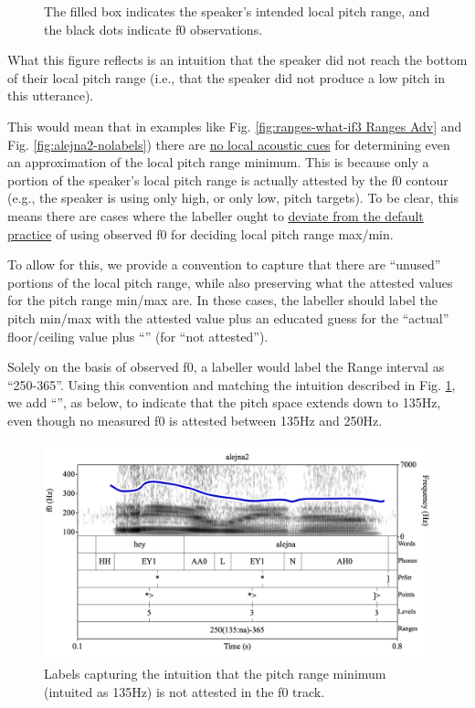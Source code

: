 \documentclass[11pt, twoside]{memoir}
\def\textlabel#1{{\relsize{-.5}\fontspec[Mapping=tex-text]{Roboto Mono}{#1}}}
\begin{document}
\begin{figure}[H]
\centering
%

%
\caption{The filled box indicates the speaker’s intended local pitch range, and the black dots indicate f0 observations.%
\label{fig:ranges intuition alejna2}%
}
\end{figure}

What this figure reflects is an intuition that the speaker did not reach the bottom of their local pitch range (i.e., that the speaker did not produce a low pitch in this utterance).

This would mean that in examples like Fig. \ref{fig:ranges-what-if3 Ranges Adv} and Fig. \ref{fig:alejna2-nolabels}) there are \uline{no local acoustic cues} for determining even an approximation of the local pitch range minimum. This is because only a portion of the speaker’s local pitch range is actually attested by the f0 contour (e.g., the speaker is using only high, or only low, pitch targets). To be clear, this means there are cases where the labeller ought to \uline{deviate from the default practice} of using observed f0 for deciding local pitch range max\slash min.

To allow for this, we provide a convention to capture that there are “unused” portions of the local pitch range, while also preserving what the attested values for the pitch range min\slash max are. In these cases, the labeller should label the pitch min\slash max with the attested value plus an educated guess for the “actual” floor\slash ceiling value plus “\textlabel{:na}” (for “not attested”).

Solely on the basis of observed f0, a labeller would label the Range interval as “250-365”. Using this convention and matching the intuition described in Fig. \ref{fig:ranges intuition alejna2}, we add “\textlabel{(135:na)}”, as below, to indicate that the pitch space extends down to 135Hz, even though no measured f0 is attested between 135Hz and 250Hz. 

\begin{figure}[H]
\centering
%
\includegraphics[width=.875\linewidth]{Ranges-alejna2.png}
%
\caption{Labels capturing the intuition that the pitch range minimum (intuited as 135Hz) is not attested in the f0 track.%
\label{fig:alejna2 na}%
}
\end{figure}
\end{document}
